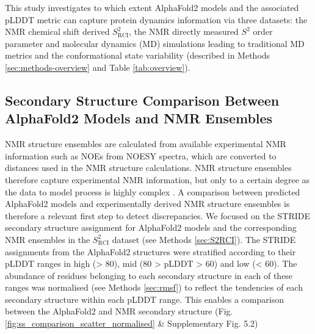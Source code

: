 This study investigates to which extent AlphaFold2 models and the associated pLDDT metric can capture protein dynamics information via three datasets: the NMR chemical shift derived $S^{2}_{\text{RCI}}$, the NMR directly measured $S^{2}$ order parameter and molecular dynamics (MD) simulations leading to traditional MD metrics and the conformational state variability (described in Methods \ref{sec:methods-overview} and Table \ref{tab:overview}).

\subsection{Secondary Structure Comparison Between AlphaFold2 Models and NMR Ensembles}

NMR structure ensembles are calculated from available experimental NMR information such as NOEs from NOESY spectra, which are converted to distances used in the NMR structure calculations. NMR structure ensembles therefore capture experimental NMR information, but only to a certain degree as the data to model process is highly complex \cite{vranken_nmr_2014}. A comparison between predicted AlphaFold2 models and experimentally derived NMR structure ensembles is therefore a relevant first step to detect discrepancies. We focused on the STRIDE \cite{frishman_knowledge-based_1995, lovell_structure_2003} secondary structure assignment for AlphaFold2 models and the corresponding NMR ensembles in the $S^{2}_{\text{RCI}}$ dataset (see Methods \ref{sec:S2RCI}). The STRIDE assignments from the AlphaFold2 structures were stratified according to their pLDDT ranges in high (> 80), mid (80 > pLDDT > 60) and low (< 60). The abundance of residues belonging to each secondary structure in each of these ranges was normalised (see Methods \ref{sec:rmsf}) to reflect the tendencies of each secondary structure within each pLDDT range. This enables a comparison between the AlphaFold2 and NMR secondary structure (Fig. \ref{fig:ss_comparison_scatter_normalised} \& Supplementary Fig. 5.2)

